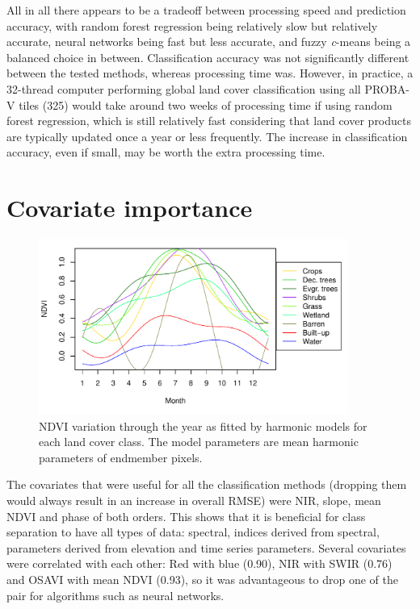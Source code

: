 \documentclass[a4paper,12pt]{scrbook}
\begin{document}
All in all there appears to be a tradeoff between processing speed and prediction accuracy, with random forest regression being relatively slow but relatively accurate, neural networks being fast but less accurate, and fuzzy \textit{c}-means being a balanced choice in between. Classification accuracy was not significantly different between the tested methods, whereas processing time was. However, in practice, a 32-thread computer performing global land cover classification using all PROBA-V tiles (325) would take around two weeks of processing time if using random forest regression, which is still relatively fast considering that land cover products are typically updated once a year or less frequently. The increase in classification accuracy, even if small, may be worth the extra processing time.

\section{Covariate importance}

\begin{figure}
  \centering
  \includegraphics[width=0.9\textwidth]{thesis-figures/timeseries}
  \caption{NDVI variation through the year as fitted by harmonic models for each land cover class. The model parameters are mean harmonic parameters of endmember pixels.}
  \label{fig-timeseries}
\end{figure}

The covariates that were useful for all the classification methods (dropping them would always result in an increase in overall RMSE) were NIR, slope, mean NDVI and phase of both orders. This shows that it is beneficial for class separation to have all types of data: spectral, indices derived from spectral, parameters derived from elevation and time series parameters. Several covariates were correlated with each other: Red with blue (0.90), NIR with SWIR (0.76) and OSAVI with mean NDVI (0.93), so it was advantageous to drop one of the pair for algorithms such as neural networks.
\end{document}

